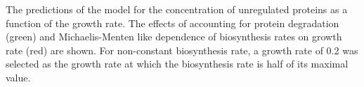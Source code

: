 \label{fig:theoreticalpred}
The predictions of the model for the concentration of unregulated proteins as a function of the growth rate.
The effects of accounting for protein degradation (green) and Michaelis-Menten like dependence of biosynthesis rates on growth rate (red) are shown.
For non-constant biosynthesis rate, a growth rate of 0.2 was selected as the growth rate at which the biosynthesis rate is half of its maximal value.